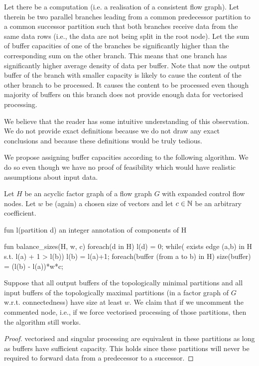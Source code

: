 \begin{observation}
  Let there be a computation (i.e. a realisation of a consistent flow graph). Let therein be two parallel branches leading from a common predecessor partition to a common successor partition such that both branches receive data from the same data rows (i.e., the data are not being split in the root node). Let the sum of buffer capacities of one of the branches be significantly higher than the corresponding sum on the other branch. This means that one branch has significantly higher average density of data per buffer. Note that now the output buffer of the branch with smaller capacity is likely to cause the content of the other branch to be processed. It causes the content to be processed even though majority of buffers on this branch does not provide enough data for vectorised processing.
\end{observation}

We believe that the reader has some intuitive understanding of this observation. We do not provide exact definitions because we do not draw any exact conclusions and because these definitions would be truly tedious.


We propose assigning buffer capacities according to the following algorithm. We do so even though we have no proof of feasibility which would have realistic assumptions about input data. 

 Let $H$ be an acyclic factor graph of a flow graph $G$ with expanded control flow nodes. Let $w$ be (again) a chosen size of vectors and let $c \in \mathbb{N}$ be an arbitrary coefficient.
\begin{samepage}
\begin{code}
fun l(partition d) { an integer annotation of components of H}

fun balance_sizes(H, w, c)
{
  foreach(d in H)
    l(d) = 0;
  while( exists edge (a,b) in H s.t. l(a) + 1 > l(b))
    l(b) = l(a)+1;
  foreach(buffer (from a to b) in H)
  {
    size(buffer) = (l(b) - l(a))*w*c;
  }
}
\end{code}
\end{samepage}
\myendalg

  Suppose that all output buffers of the topologically minimal partitions and all input buffers of the topologically maximal partitions (in a factor graph of $G$ w.r.t. connectedness) have size at least $w$. We claim that if we uncomment the commented node, i.e., if we force vectorised processing of those partitions, then the algorithm still works.
  \begin{proof}
    vectorised and singular processing are equivalent in these partitions as long as buffers have sufficient capacity. This holds since these partitions will never be required to forward data from a predecessor to a successor. 
  \end{proof}
\myendobs

